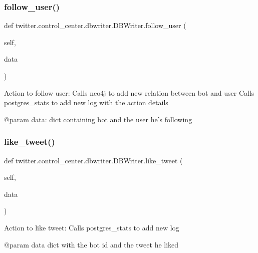 \subsubsection{\texorpdfstring{follow\+\_\+user()}{follow\_user()}}
{\footnotesize\ttfamily def twitter.\+control\+\_\+center.\+dbwriter.\+D\+B\+Writer.\+follow\+\_\+user (\begin{DoxyParamCaption}\item[{}]{self,  }\item[{}]{data }\end{DoxyParamCaption})}

\begin{DoxyVerb}Action to follow user:
Calls neo4j to add new relation between bot and user
Calls postgres_stats to add new log with the action details

@param data: dict containing bot and the user he's following
\end{DoxyVerb}
 \mbox{\label{classtwitter_1_1control__center_1_1dbwriter_1_1DBWriter_a4539c991b82dd529602cbd13d21a89b4}} 
\subsubsection{\texorpdfstring{like\+\_\+tweet()}{like\_tweet()}}
{\footnotesize\ttfamily def twitter.\+control\+\_\+center.\+dbwriter.\+D\+B\+Writer.\+like\+\_\+tweet (\begin{DoxyParamCaption}\item[{}]{self,  }\item[{}]{data }\end{DoxyParamCaption})}

\begin{DoxyVerb}Action to like tweet:
Calls postgres_stats to add new log

@param data dict with the bot id and the tweet he liked
\end{DoxyVerb}
 \mbox{\label{classtwitter_1_1control__center_1_1dbwriter_1_1DBWriter_a1005772e640f1c4aae538a7850c2d15d}} 

